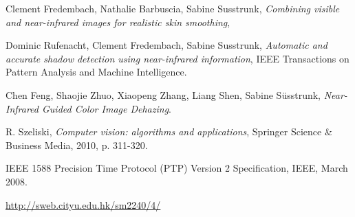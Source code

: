 \documentclass[10pt]{article}
\begin{document}
\begin{thebibliography}{9}

    Clement Fredembach, Nathalie Barbuscia, Sabine Susstrunk,
    \emph{Combining visible and near-infrared images for realistic skin smoothing},

    Dominic Rufenacht, Clement Fredembach, Sabine Susstrunk,
    \emph{Automatic and accurate shadow detection using near-infrared information},
    IEEE Transactions on Pattern Analysis and Machine Intelligence.

    Chen Feng, Shaojie Zhuo, Xiaopeng Zhang, Liang Shen, Sabine Süsstrunk,
    \emph{Near-Infrared Guided Color Image Dehazing}.

    R. Szeliski,
    \emph{Computer vision: algorithms and applications},
    Springer Science \& Business Media, 2010, p. 311-320.

    {IEEE 1588 Precision Time Protocol (PTP) Version 2 Specification},
    IEEE,
    March 2008.

    \url{http://sweb.cityu.edu.hk/sm2240/4/}

\end{thebibliography}
\end{document}
